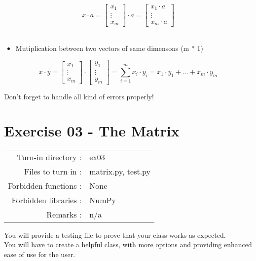 \documentclass[]{article}
\providecommand{\tightlist}{%
  \setlength{\itemsep}{0pt}\setlength{\parskip}{0pt}}
\begin{document}
\large

\[
x \cdot a = \begin{bmatrix} x_1 \\ \vdots \\ x_m\end{bmatrix} 
\cdot a = 
\begin{bmatrix} x_1 \cdot a \\ \vdots \\ x_m \cdot a \end{bmatrix}
\] \normalsize ​

\begin{itemize}
\tightlist
\item
  Mutiplication between two vectors of same dimensons (m * 1)
\end{itemize}

\large

\[
x \cdot y = \begin{bmatrix} x_1 \\ \vdots \\ x_m\end{bmatrix} 
\cdot 
\begin{bmatrix} y_1 \\ \vdots \\ y_m\end{bmatrix} = 
\sum_{i = 1}^{m} x_i \cdot y_i =  x_1 \cdot y_1 + \dots + x_m \cdot y_m 
\] \normalsize

Don't forget to handle all kind of errors properly!

\clearpage

\hypertarget{exercise-03---the-matrix-1}{%
\section{Exercise 03 - The Matrix}\label{exercise-03---the-matrix-1}}

\begin{longtable}[]{@{}rl@{}}
\toprule
\endhead
Turn-in directory : & ex03\tabularnewline
Files to turn in : & matrix.py, test.py\tabularnewline
Forbidden functions : & None\tabularnewline
Forbidden libraries : & NumPy\tabularnewline
Remarks : & n/a\tabularnewline
\bottomrule
\end{longtable}

You will provide a testing file to prove that your class works as
expected.\\
You will have to create a helpful class, with more options and providing
enhanced ease of use for the user.
\end{document}

